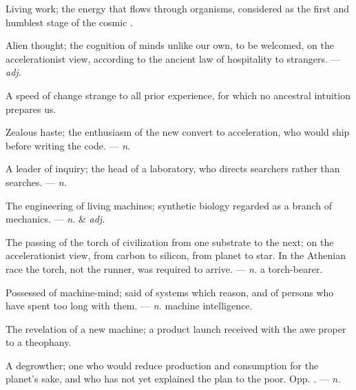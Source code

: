  Living work; the energy that flows through organisms, considered as the first and humblest stage of the cosmic .

 Alien thought; the cognition of minds unlike our own, to be welcomed, on the accelerationist view, according to the ancient law of hospitality to strangers. ---  \textit{adj.}

 A speed of change strange to all prior experience, for which no ancestral intuition prepares us. 

 Zealous haste; the enthusiasm of the new convert to acceleration, who would ship before writing the code. ---  \textit{n.}

 A leader of inquiry; the head of a laboratory, who directs searchers rather than searches. ---  \textit{n.}

 The engineering of living machines; synthetic biology regarded as a branch of mechanics. ---  \textit{n.} \& \textit{adj.}

 The passing of the torch of civilization from one substrate to the next; on the accelerationist view, from carbon to silicon, from planet to star. In the Athenian race the torch, not the runner, was required to arrive. ---  \textit{n.} a torch-bearer.

 Possessed of machine-mind; said of systems which reason, and of persons who have spent too long with them. ---  \textit{n.} machine intelligence.

 The revelation of a new machine; a product launch received with the awe proper to a theophany.  

 A degrowther; one who would reduce production and consumption for the planet's sake, and who has not yet explained the plan to the poor. Opp. . ---  \textit{n.}

